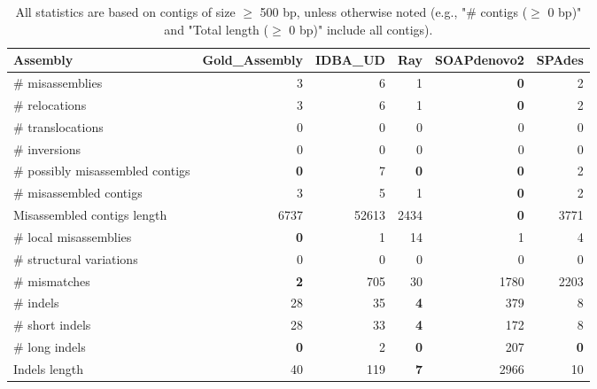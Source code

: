 \documentclass[12pt,a4paper]{article}
\begin{document}
\begin{table}[ht]
\begin{center}
\caption{All statistics are based on contigs of size $\geq$ 500 bp, unless otherwise noted (e.g., "\# contigs ($\geq$ 0 bp)" and "Total length ($\geq$ 0 bp)" include all contigs).}
\begin{tabular}{|l*{5}{|r}|}
\hline
Assembly & Gold\_Assembly & IDBA\_UD & Ray & SOAPdenovo2 & SPAdes \\ \hline
\# misassemblies & 3 & 6 & 1 & {\bf 0} & 2 \\ \hline
\hspace{5mm}\# relocations & 3 & 6 & 1 & {\bf 0} & 2 \\ \hline
\hspace{5mm}\# translocations & 0 & 0 & 0 & 0 & 0 \\ \hline
\hspace{5mm}\# inversions & 0 & 0 & 0 & 0 & 0 \\ \hline
\# possibly misassembled contigs & {\bf 0} & 7 & {\bf 0} & {\bf 0} & 2 \\ \hline
\# misassembled contigs & 3 & 5 & 1 & {\bf 0} & 2 \\ \hline
Misassembled contigs length & 6737 & 52613 & 2434 & {\bf 0} & 3771 \\ \hline
\# local misassemblies & {\bf 0} & 1 & 14 & 1 & 4 \\ \hline
\# structural variations & 0 & 0 & 0 & 0 & 0 \\ \hline
\# mismatches & {\bf 2} & 705 & 30 & 1780 & 2203 \\ \hline
\# indels & 28 & 35 & {\bf 4} & 379 & 8 \\ \hline
\hspace{5mm}\# short indels & 28 & 33 & {\bf 4} & 172 & 8 \\ \hline
\hspace{5mm}\# long indels & {\bf 0} & 2 & {\bf 0} & 207 & {\bf 0} \\ \hline
Indels length & 40 & 119 & {\bf 7} & 2966 & 10 \\ \hline
\end{tabular}
\end{center}
\end{table}
\end{document}
